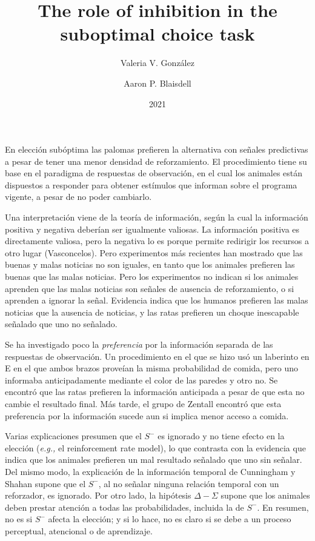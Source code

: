 \documentclass[a4paper,12pt]{article}
\title{The role of inhibition in the suboptimal choice task}
\author{Valeria V. González \and Aaron P. Blaisdell}
\date{2021}
\begin{document}
{\scshape\bfseries \maketitle}

En elección subóptima las palomas prefieren la alternativa con señales predictivas a pesar de tener una menor densidad de reforzamiento.
El procedimiento tiene su base en el paradigma de respuestas de observación, en el cual los animales están dispuestos a responder para obtener estímulos que informan sobre el programa vigente, a pesar de no poder cambiarlo.

Una interpretación viene de la teoría de información, según la cual la información positiva y negativa deberían ser igualmente valiosas.
La información positiva es directamente valiosa, pero la negativa lo es porque permite redirigir los recursos a otro lugar (Vasconcelos).
Pero experimentos más recientes han mostrado que las buenas y malas noticias no son iguales, en tanto que los animales prefieren las buenas que las malas noticias.
Pero los experimentos no indican si los animales aprenden que las malas noticias son señales de ausencia de reforzamiento, o si aprenden a ignorar la señal.
Evidencia indica que los humanos prefieren las malas noticias que la ausencia de noticias, y las ratas prefieren un choque inescapable señalado que uno no señalado.

Se ha investigado poco la {\itshape preferencia} por la información separada de las respuestas de observación.
Un procedimiento en el que se hizo usó un laberinto en E en el que ambos brazos proveían la misma probabilidad de comida, pero uno informaba anticipadamente mediante el color de las paredes y otro no.
Se encontró que las ratas prefieren la información anticipada a pesar de que esta no cambie el resultado final.
Más tarde, el grupo de Zentall encontró que esta preferencia por la información sucede aun si implica menor acceso a comida.

Varias explicaciones presumen que el $S^{-}$ es ignorado y no tiene efecto en la elección ({\itshape e.g.,} el reinforcement rate model), lo que contrasta con la evidencia que indica que los animales prefieren un mal resultado señalado que uno sin señalar.
Del mismo modo, la explicación de la información temporal de Cunningham y Shahan supone que el $S^{-}$, al no señalar ninguna relación temporal con un reforzador, es ignorado.
Por otro lado, la hipótesis $\Delta-\Sigma$ supone que los animales deben prestar atención a todas las probabilidades, incluida la de $S^{-}$.
En resumen, no es si $S^{-}$ afecta la elección; y si lo hace, no es claro si se debe a un proceso perceptual, atencional o de aprendizaje.
\end{document}
